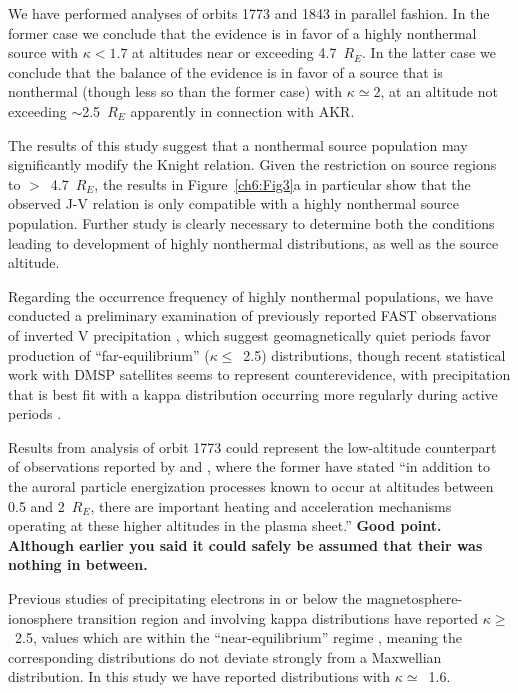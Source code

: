   We have performed analyses of orbits 1773 and 1843 in parallel fashion. In the
  former case we conclude that the evidence is in favor of a highly nonthermal
  source with $\kappa < 1.7$ at altitudes near or exceeding 4.7~$R_E$. In the
  latter case we conclude that the balance of the evidence is in favor of a
  source that is nonthermal (though less so than the former case) with $\kappa
  \simeq 2$, at an altitude not exceeding $\sim$2.5~$R_E$ apparently in
  connection with AKR.

  The results of this study suggest that a nonthermal source population may
  significantly modify the Knight relation. Given the restriction on source
  regions to $>$~4.7~$R_E$, the results in Figure~\ref{ch6:Fig3}a in particular
  show that the observed J-V relation is only compatible with a highly
  nonthermal source population. Further study is clearly necessary to determine
  both the conditions leading to development of highly nonthermal distributions,
  as well as the source altitude.

  Regarding the occurrence frequency of highly nonthermal populations, we have
  conducted a preliminary examination of previously reported FAST observations
  of inverted V precipitation
  \citep{McFadden1998a,Carlson2001,Janhunen2001,Dombeck2013}, which suggest
  geomagnetically quiet periods favor production of ``far-equilibrium'' ($\kappa
  \leq$~2.5) distributions, though recent statistical work with DMSP satellites
  seems to represent counterevidence, with precipitation that is best fit with a
  kappa distribution occurring more regularly during active periods \citep[e.g.,
  Figure~7 in][]{McIntosh2014}.

  Results from analysis of orbit 1773 could represent the low-altitude
  counterpart of observations reported by \citet{Wygant2002} and
  \citet{Schriver2003}, where the former have stated ``in addition to the
  auroral particle energization processes known to occur at altitudes between
  0.5 and 2~$R_E$, there are important heating and acceleration mechanisms
  operating at these higher altitudes in the plasma sheet.'' \textbf{Good
    point. Although earlier you said it could safely be assumed that their was
    nothing in between.}

  Previous studies of precipitating electrons in or below the
  magnetosphere-ionosphere transition region and involving kappa distributions
  \citep{Olsson1998,Ogasawara2006,Kaeppler2014a} have reported $\kappa
  \geq$~2.5, values which are within the ``near-equilibrium'' regime
  \citep{Livadiotis2010}, meaning the corresponding distributions do not deviate
  strongly from a Maxwellian distribution. In this study we have reported
  distributions with $\kappa \simeq$~1.6.

